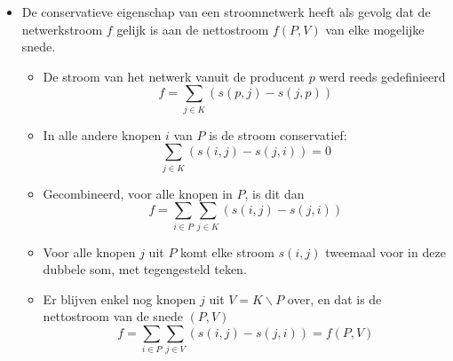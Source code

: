 \begin{itemize}
\begin{itemize}
        \item De conservatieve eigenschap van een stroomnetwerk heeft als gevolg dat de netwerkstroom $f$ gelijk is aan de nettostroom $f(P, V)$ van elke mogelijke snede.
        \begin{itemize}
            \item De stroom van het netwerk vanuit de producent $p$ werd reeds gedefinieerd
            $$f = \sum_{j \in K} (s(p, j) - s(j, p))$$ 
            \item In alle andere knopen $i$ van $P$ is de stroom conservatief:
            $$\sum_{j \in K} (s(i, j) - s(j, i)) = 0$$
            \item Gecombineerd, voor alle knopen in $P$, is dit dan
            $$f = \sum_{i \in P}\sum_{j \in K} (s(i, j) - s(j, i))$$
            \item Voor alle knopen $j$ uit $P$ komt elke stroom $s(i, j)$ tweemaal voor in deze dubbele som, met tegengesteld teken.
            \item Er blijven enkel nog knopen $j$ uit $V = K \backslash P$ over, en dat is de nettostroom van de snede $(P ,V)$
            $$f = \sum_{i \in P}\sum_{j \in V} (s(i, j) - s(j, i)) = f(P, V)$$
        \end{itemize}
        

\end{itemize}
\end{itemize}
